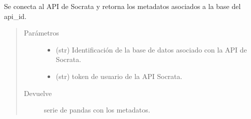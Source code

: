 \documentclass[letterpaper,10pt,openany,spanish]{sphinxmanual}
\begin{document}
\begin{fulllineitems}
\label{\detokenize{metadatos:metadatos.mostrar_metadatos}}
Se conecta al API de Socrata y retorna los metadatos asociados a la base del api\_id.
\begin{quote}\begin{description}
\item[{Parámetros}] \leavevmode\begin{itemize}
\item {} 
 \textendash{} (str) Identificación de la base de datos asociado con la API de Socrata.

\item {} 
 \textendash{} (str)  \sphinxhyphen{} token de usuario de la API Socrata.

\end{itemize}

\item[{Devuelve}] \leavevmode
serie de pandas con los metadatos.

\end{description}\end{quote}

\end{fulllineitems}

\end{document}
